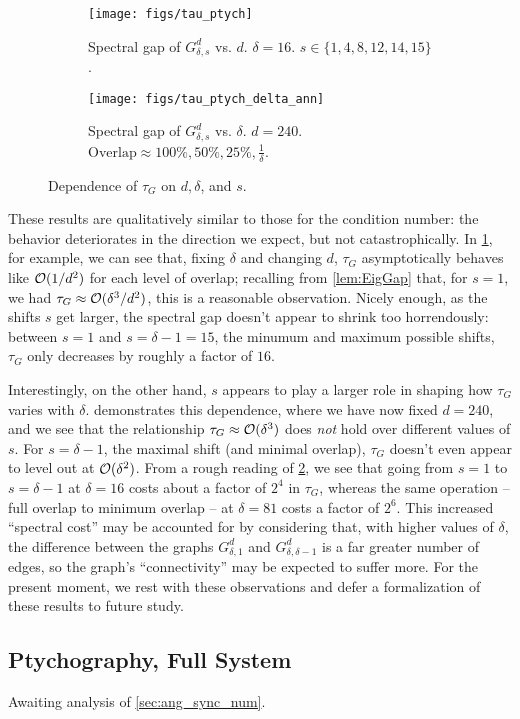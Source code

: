 \begin{figure}[htb]
  \centering
  \begin{subfigure}[b]{.49\textwidth}
    \centering
      \texttt{[image: figs/tau\_ptych]}
    \caption{Spectral gap of $G_{\delta, s}^d$ vs. $d$.  $\delta = 16$.  $s \in \{1, 4, 8, 12, 14, 15\}$.}
    \label{fig:tau_ptych_d}
  \end{subfigure}
  \hfill
  \begin{subfigure}[b]{.49\textwidth}
    \centering
      \texttt{[image: figs/tau\_ptych\_delta\_ann]}
    \caption{Spectral gap of $G_{\delta, s}^d$ vs. $\delta$.  $d = 240$.  $\text{Overlap} \approx 100\%, 50\%, 25\%, \frac{1}{\delta}$.}
    \label{fig:tau_ptych_delta}
  \end{subfigure}
  \caption{Dependence of $\tau_G$ on $d, \delta$, and $s$.}
  \label{fig:tau_ptych}
\end{figure}

These results are qualitatively similar to those for the condition number: the behavior deteriorates in the direction we expect, but not catastrophically.  In \cref{fig:tau_ptych_d}, for example, we can see that, fixing $\delta$ and changing $d$, $\tau_G$ asymptotically behaves like $\mathcal{O}(1 / d^2)$ for each level of overlap; recalling from \cref{lem:EigGap} that, for $s = 1$, we had $\tau_G \approx \mathcal{O}(\delta^3 / d^2)$, this is a reasonable observation.  Nicely enough, as the shifts $s$ get larger, the spectral gap doesn't appear to shrink too horrendously: between $s = 1$ and $s = \delta - 1 = 15$, the minumum and maximum possible shifts, $\tau_G$ only decreases by roughly a factor of $16$.

Interestingly, on the other hand, $s$ appears to play a larger role in shaping how $\tau_G$ varies with $\delta$.   demonstrates this dependence, where we have now fixed $d = 240$, and we see that the relationship $\tau_G \approx \mathcal{O}(\delta^3)$ does \emph{not} hold over different values of $s$.  For $s = \delta - 1$, the maximal shift (and minimal overlap), $\tau_G$ doesn't even appear to level out at $\mathcal{O}(\delta^2)$.  From a rough reading of \cref{fig:tau_ptych_delta}, we see that going from $s = 1$ to $s = \delta - 1$ at $\delta = 16$ costs about a factor of $2^4$ in $\tau_G$, whereas the same operation -- full overlap to minimum overlap -- at $\delta = 81$ costs a factor of $2^6$.  This increased ``spectral cost'' may be accounted for by considering that, with higher values of $\delta$, the difference between the graphs $G_{\delta, 1}^d$ and $G_{\delta, \delta - 1}^d$ is a far greater number of edges, so the graph's ``connectivity'' may be expected to suffer more.  For the present moment, we rest with these observations and defer a formalization of these results to future study.

\subsection{Ptychography, Full System}
\label{sec:pty_full}

Awaiting analysis of \cref{sec:ang_sync_num}.
